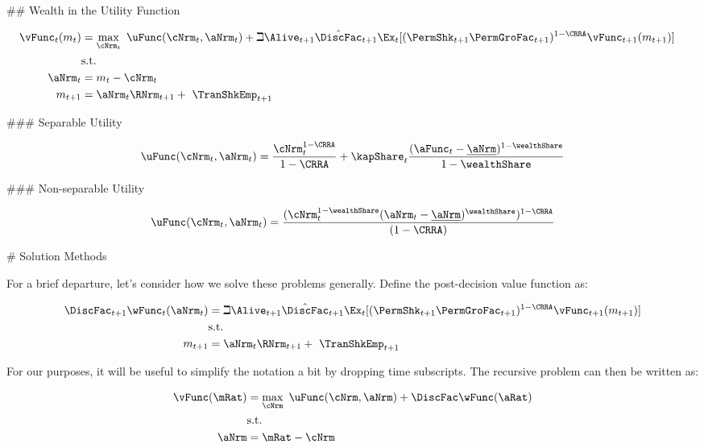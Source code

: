 ## Wealth in the Utility Function

\begin{align}
    {\vFunc}_{t}({m}_{t}) & = \max_{\cNrm_{t}} ~ \uFunc(\cNrm_{t}, \aNrm_{t})+\beth\Alive_{t+1}\hat{\DiscFac}_{t+1}
    \Ex_{t}[(\PermShk_{t+1}\PermGroFac_{t+1})^{1-\CRRA}{\vFunc}_{t+1}({m}_{t+1})]
    \\ & \text{s.t.} & \nonumber
    \\ \aNrm_{t} & = {m}_{t}-\cNrm_{t} \nonumber
    \\ {m}_{t+1} & = \aNrm_{t}\RNrm_{t+1}+ ~\TranShkEmp_{t+1}
\end{align}

### Separable Utility

\begin{equation}
    \uFunc(\cNrm_{t}, \aNrm_{t}) = \frac{\cNrm_{t}^{1-\CRRA}}{1-\CRRA}
    + \kapShare_{t} \frac{(\aFunc_{t} - \underline\aNrm)^{1-\wealthShare}}{1-\wealthShare}
\end{equation}

### Non-separable Utility

\begin{equation}
    \uFunc(\cNrm_{t}, \aNrm_{t}) = \frac{(\cNrm_{t}^{1-\wealthShare} (\aNrm_{t} - \underline\aNrm)^\wealthShare)^{1-\CRRA}}{(1-\CRRA)}
\end{equation}

# Solution Methods

For a brief departure, let's consider how we solve these problems generally. Define the post-decision value function as:

\begin{align}
    \DiscFac_{t+1} \wFunc_{t}(\aNrm_{t}) & = \beth\Alive_{t+1}\hat{\DiscFac}_{t+1}
    \Ex_{t}[(\PermShk_{t+1}\PermGroFac_{t+1})^{1-\CRRA}{\vFunc}_{t+1}({m}_{t+1})]
    \\ & \text{s.t.}
    \\ {m}_{t+1} & = \aNrm_{t}\RNrm_{t+1}+ ~\TranShkEmp_{t+1}
\end{align}

For our purposes, it will be useful to simplify the notation a bit by dropping time subscripts. The recursive problem can then be written as:

\begin{align}
    \vFunc(\mRat) & = \max_{\cNrm} ~ \uFunc(\cNrm, \aNrm) + \DiscFac \wFunc(\aRat)
    \\ & \text{s.t.}
    \\ \aNrm & = \mRat-\cNrm
\end{align}

